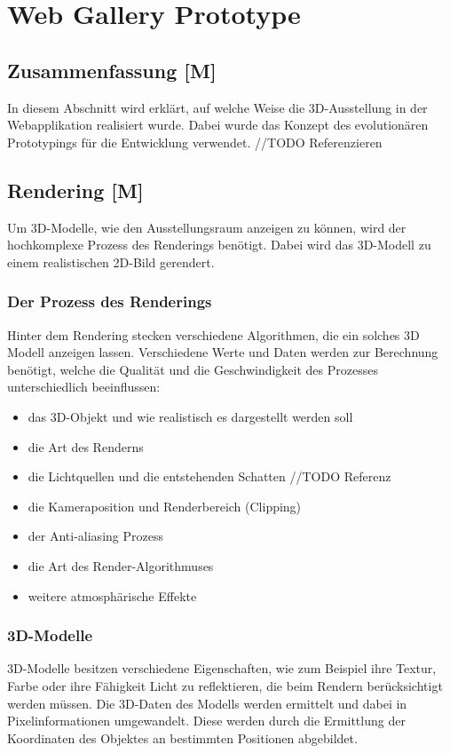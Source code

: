 \section{Web Gallery Prototype}
\subsection{Zusammenfassung [M]} 
In diesem Abschnitt wird erklärt, auf welche Weise die 3D-Ausstellung in der Webapplikation realisiert wurde. Dabei wurde das Konzept des evolutionären Prototypings für die Entwicklung verwendet.  //TODO Referenzieren 

\subsection{Rendering [M]} 
Um 3D-Modelle, wie den Ausstellungsraum anzeigen zu können, wird der hochkomplexe Prozess des Renderings benötigt. Dabei wird das 3D-Modell zu einem realistischen 2D-Bild gerendert. 
\cite{AdobeRendering} \cite{Rendering3DModels}

\subsubsection{Der Prozess des Renderings}
Hinter dem Rendering stecken verschiedene Algorithmen, die ein solches 3D Modell anzeigen lassen. Verschiedene Werte und Daten werden zur Berechnung benötigt, welche die Qualität und die Geschwindigkeit des Prozesses unterschiedlich beeinflussen:

\begin{itemize}
    \item das 3D-Objekt und wie realistisch es dargestellt werden soll
    \item die Art des Renderns
    \item die Lichtquellen und die entstehenden Schatten //TODO Referenz 
    \item die Kameraposition und Renderbereich (Clipping)
    \item der Anti-aliasing Prozess
    \item die Art des Render-Algorithmuses
    \item weitere atmosphärische Effekte 
    
    
\end{itemize}
\cite{Rendering3DModels}

\subsubsection{3D-Modelle}
3D-Modelle besitzen verschiedene Eigenschaften, wie zum Beispiel ihre Textur, Farbe oder ihre Fähigkeit Licht zu reflektieren, die beim Rendern berücksichtigt werden müssen. Die 3D-Daten des Modells werden ermittelt und dabei in Pixelinformationen umgewandelt. Diese werden durch die Ermittlung der Koordinaten des Objektes an bestimmten Positionen abgebildet. \cite{Rendering3DModels}

